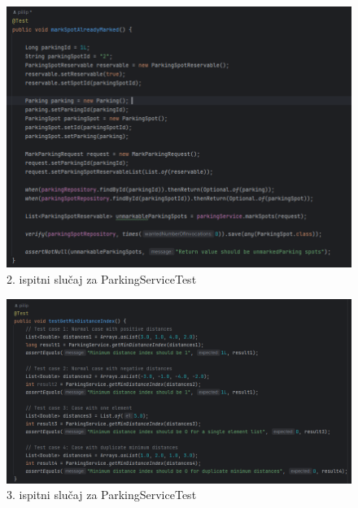 \begin{figure}[H]
	\includegraphics[width=\textwidth]{slike/markspotmarked.png} %
	\centering
	\caption{2. ispitni slučaj za ParkingServiceTest}
	\label{fig:dijagramstanja}
\end{figure}

\begin{figure}[H]
	\includegraphics[width=\textwidth]{slike/testmindistance.png} %
	\centering
	\caption{3. ispitni slučaj za ParkingServiceTest}
	\label{fig:dijagramstanja}
\end{figure}

